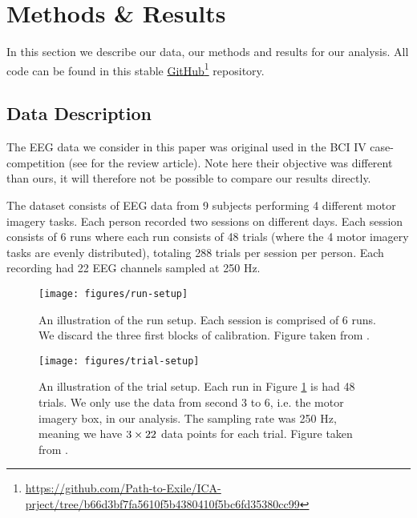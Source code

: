 
\section{Methods \& Results}

In this section we describe our data, our methods and results for our analysis. All code can be found in this stable \href{https://github.com/Path-to-Exile/ICA-prject/tree/b66d3bf7fa5610f5b4380410f5bc6fd35380cc99}{GitHub}\footnote{\url{https://github.com/Path-to-Exile/ICA-prject/tree/b66d3bf7fa5610f5b4380410f5bc6fd35380cc99}} repository.

\subsection{Data Description}\label{sec:data-description}

	The EEG data we consider in this paper was original used in the BCI IV case-competition (see \cite{bcireview2012} for the review article). Note here their objective was different than ours, it will therefore not be possible to compare our results directly. 

	The dataset consists of EEG data from 9 subjects performing 4 different motor imagery tasks. Each person recorded two sessions on different days. Each session consists of 6 runs where each run consists of 48 trials (where the 4 motor imagery tasks are evenly distributed), totaling 288 trials per session per person. Each recording had 22 EEG channels sampled at 250 Hz.

		\begin{figure}
			\centering
				\texttt{[image: figures/run-setup]}
			\caption{An illustration of the run setup. Each session is comprised of 6 runs. We discard the three first blocks of calibration. Figure taken from \cite{BCIdataset2008}.}
			\label{fig:run-setup}
		\end{figure}

		\begin{figure}
			\centering
				\texttt{[image: figures/trial-setup]}
			\caption{An illustration of the trial setup. Each run in Figure \ref{fig:run-setup} is had 48 trials. We only use the data from second 3 to 6, i.e. the motor imagery box, in our analysis. The sampling rate was 250 Hz, meaning we have $3 \time 250 \times 22$ data points for each trial. Figure taken from \cite{BCIdataset2008}.}
			\label{fig:trial-setup}
		\end{figure}

